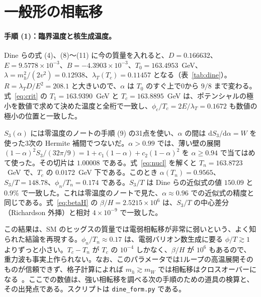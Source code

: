 \documentclass[a4paper,10pt]{ltjsarticle}
\newcommand{\dd}{\mathrm{d}}
\begin{document}
\section{一般形の相転移}\label{sec:dine}

\paragraph{手順 (1)：臨界温度と核生成温度。}Dine らの式 (4)、(8)〜(11) に今の質量を入れると、$D=0.166632$、$E=9.5778\times10^{-3}$、$B=-4.3903\times10^{-3}$、$T_0=163.4953$~GeV、$\lambda=m_h^2/(2v^2)=0.12938$、$\lambda_T(T_c)=0.11457$ となる（表~\ref{tab:dine}）。$R=\lambda_TD/E^2=208.1$ と大きいので、$\alpha$ は $T_0$ のすぐ上で0から $9/8$ まで変わる。式~\eqref{eq:crit} の $T_1=163.9390$~GeV と $T_c=163.8895$~GeV は、ポテンシャルの極小を数値で求めて決めた温度と全桁で一致し、$\phi_c/T_c=2E/\lambda_T=0.1672$ も数値の極小の位置と一致した。

$S_3(\alpha)$ には零温度のノートの手順 (9) の31点を使い、$\alpha$ の間は $\dd S_3/\dd\alpha=W$ を使った3次の Hermite 補間でつないだ。$\alpha>0.99$ では、薄い壁の展開 $(1-\alpha)^2S_3/(32\pi/9)=1+c_1(1-\alpha)+c_2(1-\alpha)^2$ を $\alpha\ge0.94$ で当てはめて使った。その切片は $1.00008$ である。式~\eqref{eq:nucl} を解くと $T_n=163.8723$~GeV で、$T_c$ の $0.0172$~GeV 下である。このとき $\alpha(T_n)=0.9565$、$S_3/T=148.78$、$\phi_n/T_n=0.174$ である。$S_3/T$ は Dine らの近似式の値 $150.09$ と $0.9\%$ で一致した。これは零温度のノートで見た、$\alpha\approx0.96$ での近似式の精度と同じである。式~\eqref{eq:betaH} の $\beta/H=2.5215\times10^6$ は、$S_3/T$ の中心差分（Richardson 外挿）と相対 $4\times10^{-9}$ で一致した。

この結果は、SM のヒッグスの質量では電弱相転移が非常に弱いという、よく知られた結論を再現する。$\phi_n/T_n\approx0.17$ は、電弱バリオン数生成に要る $\phi/T\gtrsim1$ よりずっと小さい。$T_c-T_n$ が $T_c$ の $10^{-4}$ しかなく、$\beta/H$ が $10^6$ もあるので、重力波も事実上作られない。なお、このパラメータでは1ループの高温展開そのものが信頼できず、格子計算によれば $m_h\gtrsim m_W$ では相転移はクロスオーバーになる~\cite{kajantie96}。ここでの数値は、強い相転移を調べる次の手順のための道具の検算と、その出発点である。スクリプトは \texttt{dine\_form.py} である。
\end{document}
